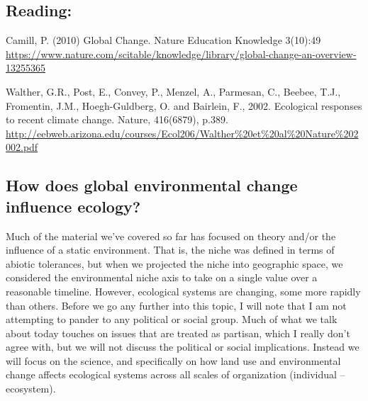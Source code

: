 \documentclass[12pt]{article}
\begin{document}
\subsection*{Reading:}

Camill, P. (2010) Global Change. Nature Education Knowledge 3(10):49 \\
\url{https://www.nature.com/scitable/knowledge/library/global-change-an-overview-13255365}

\bigskip

Walther, G.R., Post, E., Convey, P., Menzel, A., Parmesan, C., Beebee, T.J., Fromentin, J.M., Hoegh-Guldberg, O. and Bairlein, F., 2002. Ecological responses to recent climate change. Nature, 416(6879), p.389. \\ \url{http://eebweb.arizona.edu/courses/Ecol206/Walther%20et%20al%20Nature%202002.pdf}
















\begin{center}
\noindent\hrulefill 
\end{center}



\clearpage


\subsection*{How does global environmental change influence ecology?}

Much of the material we've covered so far has focused on theory and/or the influence of a static environment. That is, the niche was defined in terms of abiotic tolerances, but when we projected the niche into geographic space, we considered the environmental niche axis to take on a single value over a reasonable timeline. However, ecological systems are changing, some more rapidly than others. Before we go any further into this topic, I will note that I am not attempting to pander to any political or social group. Much of what we talk about today touches on issues that are treated as partisan, which I really don't agree with, but we will not discuss the political or social implications. Instead we will focus on the science, and specifically on how land use and environmental change affects ecological systems across all scales of organization (individual -- ecosystem). 
\end{document}
